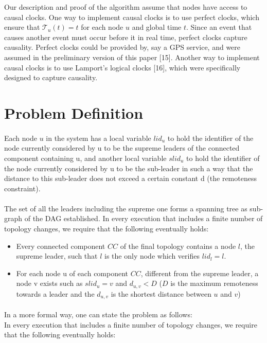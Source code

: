Our description and proof of the algorithm assume that nodes have access to causal clocks. One way to implement causal clocks is to use perfect clocks, which ensure that $\mathcal{T}_u(t) = t$ for each node $u$ and global time $t$. Since an event that causes another event must occur before it in real time, perfect clocks capture causality. Perfect clocks could be provided by, say a GPS service, and were assumed in the preliminary version of this paper [15]. Another way to implement causal clocks is to use Lamport’s logical clocks [16], which were specifically designed to capture causality.
\newpage
\section{Problem Definition}
\paragraph{}Each node $u$ in the system has a local variable $lid_{u}$ to hold the identifier of the node currently considered by u to be the supreme leaders of the connected component containing u, and another local variable $slid_u$ to hold the identifier of the node currently considered by u to be the sub-leader in such a way that the distance to this sub-leader does not exceed a certain constant d (the remoteness constraint).
\paragraph{}The set of all the leaders including the supreme one forms a spanning tree as sub-graph of the DAG established.
In every execution that includes a finite number of topology changes, we require that the following eventually holds:
\begin{itemize}
	\item Every connected component $CC$ of the final topology contains a node $l$, the supreme leader, such that $l$ is the only node which verifies $ lid_{l} = l $.
	\item For each node u of each component $CC$, different from the supreme leader, a node v exists such as $slid_{u} = v$ and $d_{u,v} < D$ ($D$ is the maximum remoteness towards a leader and the $ d_{u,v} $ is the shortest distance between $u$ and $v$)
\end{itemize}

\paragraph{}In a more formal way, one can state the problem as follows:\\
In every execution that includes a finite number of topology changes, we require that the following eventually holds:

